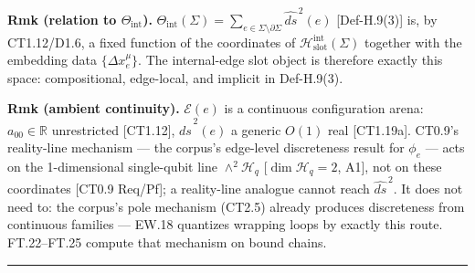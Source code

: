 \begin{definition}
\textbf{Rmk (relation to $\Theta_{\mathrm{int}}$).} $\Theta_{\mathrm{int}}(\Sigma)=\sum_{e\in\Sigma\setminus\partial\Sigma}\widehat{ds}^{\,2}(e)$ [Def-H.9(3)] is, by CT1.12/D1.6, a fixed function of the coordinates of $\mathcal H_{\mathrm{slot}}^{\mathrm{int}}(\Sigma)$ together with the embedding data $\{\Delta x_e^\mu\}$. The internal-edge slot object is therefore exactly this space: compositional, edge-local, and implicit in Def-H.9(3).

\textbf{Rmk (ambient continuity).} $\mathcal E(e)$ is a continuous configuration arena: $a_{00}\in\mathbb R$ unrestricted [CT1.12], $\widehat{ds}^{\,2}(e)$ a generic $O(1)$ real [CT1.19a]. CT0.9's reality-line mechanism — the corpus's edge-level discreteness result for $\phi_e$ — acts on the 1-dimensional single-qubit line $\wedge^2\mathcal H_q$ [$\dim\mathcal H_q=2$, A1], not on these coordinates [CT0.9 Req/Pf]; a reality-line analogue cannot reach $\widehat{ds}^{\,2}$. It does not need to: the corpus's pole mechanism (CT2.5) already produces discreteness from continuous families — EW.18 quantizes wrapping loops by exactly this route. FT.22–FT.25 compute that mechanism on bound chains.

\vspace{2pt}\noindent\rule{\textwidth}{0.4pt}\vspace{2pt}

\end{definition}

